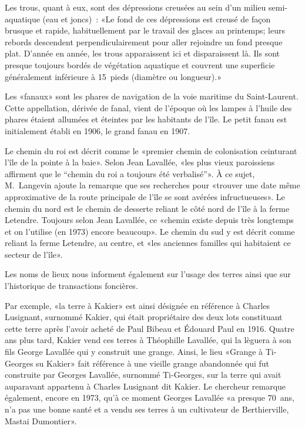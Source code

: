 \documentclass[12pt]{report}
\begin{document}
Les trous, quant à eux, sont des dépressions creusées au sein d’un milieu semi-aquatique (eau et joncs) : «Le fond de ces dépressions est creusé de façon brusque et rapide, habituellement par le travail des glaces au printemps; leurs rebords descendent perpendiculairement pour aller rejoindre un fond presque plat. D’année en année, les trous apparaissent ici et disparaissent là. Ils sont presque toujours bordés de végétation aquatique et couvrent une superficie généralement inférieure à 15 pieds (diamètre ou longueur).»

Les «fanaux» sont les phares de navigation de la voie maritime du Saint-Laurent. Cette appellation, dérivée de fanal, vient de l’époque où les lampes à l’huile des phares étaient allumées et éteintes par les habitants de l’île. Le petit fanau est initialement établi en 1906, le grand fanau en 1907.

Le chemin du roi est décrit comme le «premier chemin de colonisation ceinturant l’île de la pointe à la baie». Selon Jean Lavallée, «les plus vieux paroissiens affirment que le “chemin du roi a toujours été verbalisé”». À ce sujet, M. Langevin ajoute la remarque que ses recherches pour «trouver une date même approximative de la route principale de l’île se sont avérées infructueuses». Le chemin du nord est le chemin de desserte reliant le côté nord de l’île à la ferme Letendre. Toujours selon Jean Lavallée, ce «chemin existe depuis très longtemps et on l’utilise (en 1973) encore beaucoup». Le chemin du sud y est décrit comme reliant la ferme Letendre, au centre, et «les anciennes familles qui habitaient ce secteur de l’île».

Les noms de lieux nous informent également sur l’usage des terres ainsi que sur l’historique de transactions foncières.

Par exemple, «la terre à Kakier» est ainsi désignée en référence à Charles Lusignant, surnommé Kakier, qui était propriétaire des deux lots constituant cette terre après l’avoir acheté de Paul Bibeau et Édouard Paul en 1916. Quatre ans plus tard, Kakier vend ces terres à Théophille Lavallée, qui la lèguera à son fils George Lavallée qui y construit une grange. Ainsi, le lieu «Grange à Ti-Georges su Kakier» fait référence à une vieille grange abandonnée qui fut construite par Georges Lavallée, surnommé Ti-Georges, sur la terre qui avait auparavant appartenu à Charles Lusignant dit Kakier. Le chercheur remarque également, encore en 1973, qu’à ce moment Georges Lavallée «a presque 70 ans, n’a pas une bonne santé et a vendu ses terres à un cultivateur de Berthierville, Mastai Dumontier».
\end{document}
